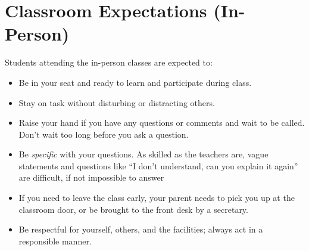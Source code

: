 \documentclass{../oss-handout}
\begin{document}
\section*{Classroom Expectations (In-Person)}
Students attending the in-person classes are expected to:
\begin{itemize}[nosep]
\item Be in your seat and ready to learn and participate during class.
\item Stay on task without disturbing or distracting others.
\item Raise your hand if you have any questions or comments and wait to be
  called. Don't wait too long before you ask a question.
  \item Be \emph{specific} with your questions. As skilled as the teachers are,
  vague statements and questions like ``I don't understand, can you explain it
  again'' are difficult, if not impossible to answer
\item If you need to leave the class early, your parent needs to pick you up at
  the classroom door, or be brought to the front desk by a secretary.
\item Be respectful for yourself, others, and the facilities; always act in
  a responsible manner.
\end{itemize}
\end{document}
